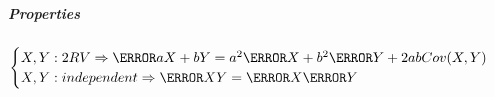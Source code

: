 \subparagraph{Properties}
\begin{center}
	$\begin{cases}
	X,Y: 2 RV \Rightarrow \V{aX+bY}=a^{2}\V{X}+b^{2}\V{Y}+2abCov(X,Y)\\
	X,Y: independent \Rightarrow \V{XY}=\V{X}\V{Y}	
	\end{cases}$
\end{center}
